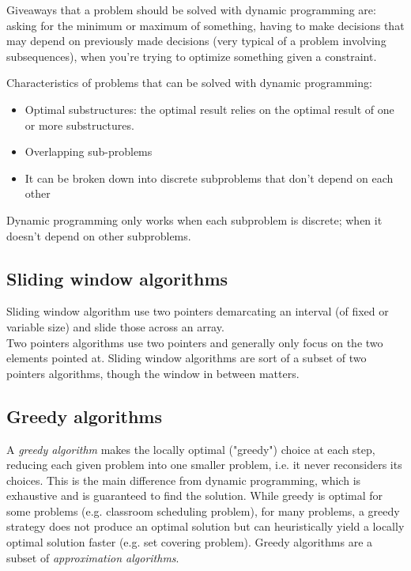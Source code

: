 \documentclass[8pt, table, xcdraw]{article}%
\begin{document}
Giveaways that a problem should be solved with dynamic programming are: asking for the minimum or maximum of something, having to make decisions that may depend on previously made decisions (very typical of a problem involving subsequences), when you’re trying to optimize
something given a constraint.

Characteristics of problems that can be solved with dynamic programming:

\begin{itemize}
    \item Optimal substructures: the optimal result relies on the optimal result of one or more substructures.
    \item Overlapping sub-problems
    \item It can be broken down into discrete subproblems that don’t depend on each other
\end{itemize}

Dynamic programming only works when each subproblem is discrete; when it doesn’t depend on other subproblems.

\subsection{Sliding window algorithms}

Sliding window algorithm use two pointers demarcating an interval (of fixed or variable size) and slide those across an array.\\
Two pointers algorithms use two pointers and generally only focus on the two elements pointed at. Sliding window algorithms are sort of a subset of two pointers algorithms, though the window in between matters.

\subsection{Greedy algorithms}

A \emph{greedy algorithm} makes the locally optimal ("greedy") choice at each step, reducing each given problem into one smaller problem, i.e. it never reconsiders its choices. This is the main difference from dynamic programming, which is exhaustive and is guaranteed to find the solution. While greedy is optimal for some problems (e.g. classroom scheduling problem), for many problems, a greedy strategy does not produce an optimal solution but can heuristically yield a locally optimal solution faster (e.g. set covering problem). Greedy algorithms are a subset of \emph{approximation algorithms}.
\end{document}
